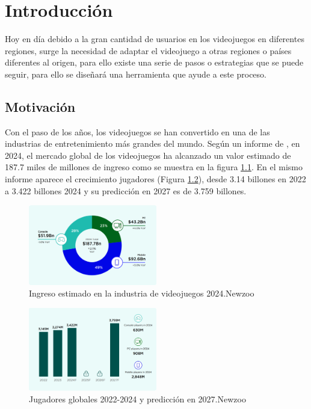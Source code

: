 \chapter{Introducción}
\label{cap:introduccion}
Hoy en día debido a la gran cantidad de usuarios en los videojuegos en diferentes regiones, surge la necesidad de adaptar el videojuego a otras regiones o países diferentes al origen, para ello existe una serie de pasos o estrategias que se puede seguir, para ello se diseñará una herramienta que ayude a este proceso.
\section{Motivación}
Con el paso de los años, los videojuegos se han convertido en una de las industrias de entretenimiento más grandes del mundo. Según un informe de \cite{NZIngreso2024}, en 2024, el mercado global de los videojuegos ha alcanzado un valor estimado de 187.7 miles de millones de ingreso como se muestra en la figura \ref{fig:NewZooRevenues}. En el mismo informe aparece el crecimiento jugadores (Figura \ref{fig:NewzooPlayers}), desde 3.14 billones en 2022 a 3.422 billones 2024 y su predicción en 2027 es de 3.759 billones.
\begin{figure}[H]
	\centering
	\includegraphics[width = 0.5\textwidth]{Imagenes/Newzoo_2024_Revenues.png}
	\caption{Ingreso estimado en la industria de videojuegos 2024.Newzoo}
	\label{fig:NewZooRevenues}
\end{figure}

\begin{figure}[H]
	\centering
	\includegraphics[width = 0.5\textwidth]{Imagenes/Newzoo_Players.png}
	\caption{Jugadores globales 2022-2024 y predicción en 2027.Newzoo}
	\label{fig:NewzooPlayers}
\end{figure}

